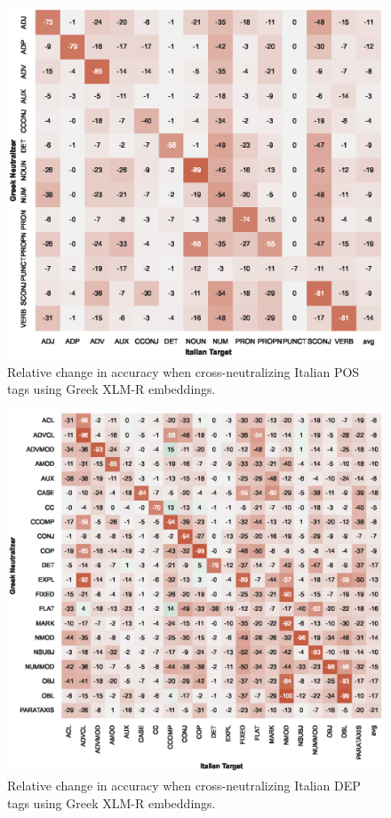 \documentclass[11pt,a4paper]{article}
\begin{document}
\begin{figure}[t]
    \centering
    \includegraphics{full_figures/POS-crosslingual-it_vit_from_el_gdt-accdrop.eps}
    \caption{Relative change in accuracy when cross-neutralizing Italian POS tags using Greek XLM-R embeddings.}
    \label{fig:xlingual_xneutr_pos_it_vit_from_el_gdt}
\end{figure}

\begin{figure}[t]
    \centering
    \includegraphics{full_figures/DEP-crosslingual-it_vit_from_el_gdt-accdrop.eps}
    \caption{Relative change in accuracy when cross-neutralizing Italian DEP tags using Greek XLM-R embeddings.}
    \label{fig:xlingual_xneutr_dep_it_vit_from_el_gdt}
\end{figure}
\end{document}
